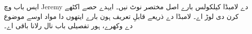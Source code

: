 \documentclass[../../../include/open-logic-chapter]{subfiles}
\begin{document}

\begin{editorial}
ایس باب وچ Jeremy دے لامبڈا کیلکولس بارے اصل مختصر نوٹ نیں۔
ایہدے حصے اکٹھے کرن دی لوڑ اے۔ لامبڈا دے ذریعے قابلِ تعریف ہون بارے
ایتھوں دا مواد اوسے موضوع دے وکھرے، ہور تفصیلی باب نال رلانا باقی اے۔
\end{editorial}














\OLEndChapterHook
\end{document}
